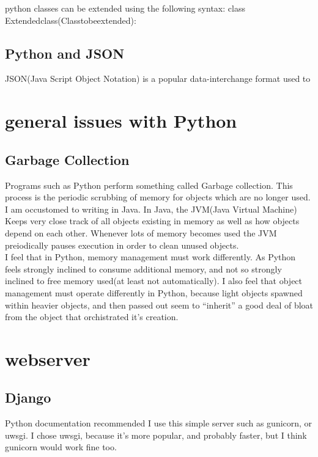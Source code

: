 python classes can be extended using the following syntax:
    class Extendedclass(Classtobeextended):

\subsection{Python and JSON}
JSON(Java Script Object Notation) is a popular data-interchange format used to


\section{general issues with Python}

\subsection{Garbage Collection}

Programs such as Python perform something called Garbage collection.  This process is the periodic scrubbing of memory for objects which are no longer used.\\
I am occustomed to writing in Java.  In Java, the JVM(Java Virtual Machine) Keeps very close track of all objects existing in memory as well as how objects depend on each other.  Whenever lots of memory becomes used the JVM preiodically pauses execution in order to clean unused objects.\\
I feel that in Python, memory management must work differently.  As Python feels strongly inclined to consume additional memory, and not so strongly inclined to free memory used(at least not automatically).  I also feel that object management must operate differently in Python, because light objects spawned within heavier objects, and then passed out seem to ``inherit'' a good deal of bloat from the object that orchistrated it's creation.



\section{webserver}

\subsection{Django}

Python documentation recommended I use this simple server such as gunicorn, or uwsgi.  I chose uwsgi, because it's more popular, and probably faster, but I think gunicorn would work fine too.

